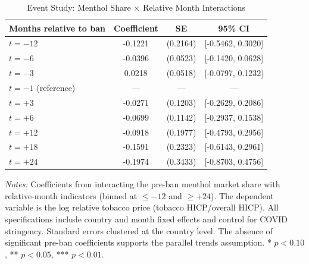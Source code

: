 \begin{table}[H]
\centering
\caption{Event Study: Menthol Share $\times$ Relative Month Interactions}
\label{tab:eventstudy}
\begin{threeparttable}
\begin{tabular}{lccc}
\toprule
Months relative to ban & Coefficient & SE & 95\% CI \\
\midrule
$t = -12$ & -0.1221 & (0.2164) & [-0.5462, 0.3020] \\
$t = -6$ & -0.0396 & (0.0523) & [-0.1420, 0.0628] \\
$t = -3$ & 0.0218 & (0.0518) & [-0.0797, 0.1232] \\
$t = -1$ (reference) & --- & --- & --- \\
$t = +3$ & -0.0271 & (0.1203) & [-0.2629, 0.2086] \\
$t = +6$ & -0.0699 & (0.1142) & [-0.2937, 0.1538] \\
$t = +12$ & -0.0918 & (0.1977) & [-0.4793, 0.2956] \\
$t = +18$ & -0.1591 & (0.2323) & [-0.6143, 0.2961] \\
$t = +24$ & -0.1974 & (0.3433) & [-0.8703, 0.4756] \\
\bottomrule
\end{tabular}
\begin{tablenotes}[flushleft]
\small
\item \textit{Notes:} Coefficients from interacting the pre-ban menthol market share with relative-month indicators (binned at $\leq -12$ and $\geq +24$). The dependent variable is the log relative tobacco price (tobacco HICP/overall HICP). All specifications include country and month fixed effects and control for COVID stringency. Standard errors clustered at the country level. The absence of significant pre-ban coefficients supports the parallel trends assumption. * $p<0.10$, ** $p<0.05$, *** $p<0.01$.
\end{tablenotes}
\end{threeparttable}
\end{table}
